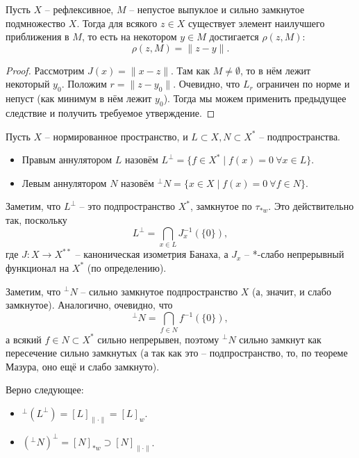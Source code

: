 \begin{corollary}\label{cor:metric-projection}
    Пусть $X$ -- рефлексивное, $M$ -- непустое выпуклое и сильно замкнутое подмножество $X$.
    Тогда для всякого $z \in X$ существует элемент наилучшего приближения в $M$, то есть на некотором $y \in M$ достигается $\rho(z, M)\colon$
    \[
        \rho(z, M) = \|z - y\|.
    \]
\end{corollary}
\begin{proof}
    Рассмотрим $J(x) = \|x - z\|$.
    Там как $M \neq \emptyset$, то в нём лежит некоторый $y_0$.
    Положим $r = \|z - y_0\|$.
    Очевидно, что $L_r$ ограничен по норме и непуст (как минимум в нём лежит $y_0$).
    Тогда мы можем применить предыдущее следствие и получить требуемое утверждение.
\end{proof}
\begin{definition}\label{def:annulators}
    Пусть $X$ -- нормированное пространство, и $L \subset X, N \subset X^*$ -- подпространства.
    \begin{itemize}
        \item Правым аннулятором $L$ назовём $L^\perp = \{f \in X^* \mid f(x) = 0 \ \forall x \in L\}$.
        \item Левым аннулятором $N$ назовём $^\perp N = \{x \in X \mid f(x) = 0 \ \forall f \in N\}$.
    \end{itemize}
\end{definition}
\begin{note}
    Заметим, что $L^\perp$ -- это подпространство $X^*$, замкнутое по $\tau_{*w}$.
    Это действительно так, поскольку
    \[
        L^{\perp} = \bigcap_{x \in L} J_x^{-1}(\{0\}),
    \]
    где $J\colon X \to X^{**}$ -- каноническая изометрия Банаха, а $J_x$ -- *-слабо непрерывный функционал на $X^*$ (по определению).

    Заметим, что $^\perp N$ -- сильно замкнутое подпространство $X$ (а, значит, и слабо замкнутое).
    Аналогично, очевидно, что
    \[
        ^{\perp} N = \bigcap_{f \in N} f^{-1}(\{0\}),
    \]
    а всякий $f \in N \subset X^*$ сильно непрерывен, поэтому $^\perp N$ сильно замкнут как пересечение сильно замкнутых (а так как это -- подпространство, то, по теореме Мазура, оно ещё и слабо замкнуто).
\end{note}
\begin{corollary}\label{cor:annulator_equations}
    Верно следующее:
    \begin{itemize}
        \item $^\perp(L^\perp) = [L]_{\|\cdot\|} = [L]_{w}$.
        \item $(^\perp N)^\perp = [N]_{*w} \supset [N]_{\|\cdot\|}$.
    \end{itemize}
\end{corollary}
